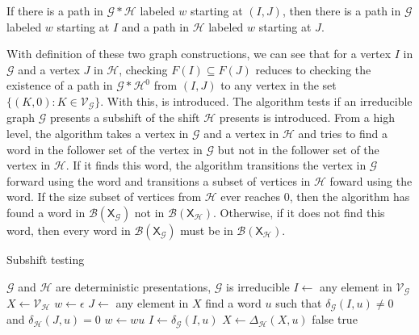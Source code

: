 \documentclass[hidelinks]{article}
\newcommand{\Gc}{\mathcal{G}}  %
\newcommand{\Hc}{\mathcal{H}}  %
\newcommand{\Vc}{\mathcal{V}}
\newcommand{\Bc}{\mathcal{B}}
\newcommand{\shift}[1]{\mathsf{X}_{#1}}
\theoremstyle{definition}
\begin{document}
\begin{theorem}
    If there is a path in \(\Gc * \Hc\) labeled \(w\) starting at \((I, J)\), then 
    there is a path in \(\Gc\) labeled \(w\) starting at \(I\) and a path in \(\Hc\)
    labeled \(w\) starting at \(J\).
\end{theorem}

With definition of these two graph constructions, we can see that for a vertex 
\(I\) in \(\Gc\) and a vertex \(J\) in \(\Hc\), checking \(F(I) \subseteq F(J)\)
reduces to checking the existence of a path in \(\Gc * \Hc^0\) from \((I, J)\) to 
any vertex in the set \(\{(K, 0) : K \in \Vc_\Gc\}\). With this, 
is introduced. The algorithm tests if an irreducible graph \(\Gc\) presents a subshift of the 
shift \(\Hc\) presents is introduced. From a high 
level, the algorithm takes a vertex in \(\Gc\) and a vertex in \(\Hc\) and 
tries to find a word in the follower set of the vertex in \(\Gc\) but 
not in the follower set of the vertex in \(\Hc\). If it finds this word, 
the algorithm transitions the vertex in \(\Gc\) forward using the word and
transitions a subset of vertices in \(\Hc\) foward using the word. If 
the size subset of vertices from \(\Hc\) ever reaches \(0\), then 
the algorithm has found a word in \(\Bc(\shift{\Gc})\) not in \(\Bc(\shift{\Hc})\). 
Otherwise, if it does not find this word, then every word in \(\Bc(\shift{\Gc})\) must be in \(\Bc(\shift{\Hc})\).

\begin{algorithm}[H]
    \caption{Subshift testing}\label{algsubshift}
    \begin{algorithmic}[1]
        \Require $\Gc$ and $\Hc$ are deterministic presentations, $\Gc$ is irreducible
        \Procedure{is\_subshift}{$\Gc, \Hc$}
                \State $I \gets$ any element in $\Vc_\Gc$
                \State $X \gets \Vc_\Hc$
                \State $w \gets \epsilon$
                \Repeat
                    \State $J \gets$ any element in $X$
                    \State find a word $u$ such that $\delta_\Gc(I, u) \neq 0$ and $\delta_\Hc(J, u) = 0$ 
                        \State $w \gets wu$
                        \State $I \gets \delta_\Gc(I, u)$
                        \State $X \gets \Delta_\Hc(X, u)$
                            \State \Return false
                        \EndIf
                    \EndIf
            \State \Return true
        \EndProcedure
    \end{algorithmic}
\end{algorithm}
\end{document}
